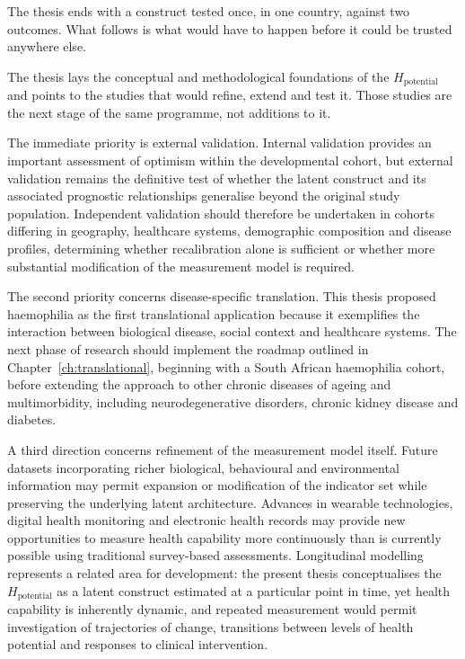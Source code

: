\noindent The thesis ends with a construct tested once, in one country, against
two outcomes. What follows is what would have to happen before it could be
trusted anywhere else.

\noindent The thesis lays the conceptual and methodological foundations of the $H_{\text{potential}}$ and points to the studies that would refine, extend and test it. Those studies are the next stage of the same programme, not additions to it.

The immediate priority is external validation. Internal validation provides an important assessment of optimism within the developmental cohort, but external validation remains the definitive test of whether the latent construct and its associated prognostic relationships generalise beyond the original study population. Independent validation should therefore be undertaken in cohorts differing in geography, healthcare systems, demographic composition and disease profiles, determining whether recalibration alone is sufficient or whether more substantial modification of the measurement model is required.

The second priority concerns disease-specific translation. This thesis proposed haemophilia as the first translational application because it exemplifies the interaction between biological disease, social context and healthcare systems. The next phase of research should implement the roadmap outlined in Chapter~\ref{ch:translational}, beginning with a South African haemophilia cohort, before extending the approach to other chronic diseases of ageing and multimorbidity, including neurodegenerative disorders, chronic kidney disease and diabetes.

A third direction concerns refinement of the measurement model itself. Future datasets incorporating richer biological, behavioural and environmental information may permit expansion or modification of the indicator set while preserving the underlying latent architecture. Advances in wearable technologies, digital health monitoring and electronic health records may provide new opportunities to measure health capability more continuously than is currently possible using traditional survey-based assessments. Longitudinal modelling represents a related area for development: the present thesis conceptualises the $H_{\text{potential}}$ as a latent construct estimated at a particular point in time, yet health capability is inherently dynamic, and repeated measurement would permit investigation of trajectories of change, transitions between levels of health potential and responses to clinical intervention.

